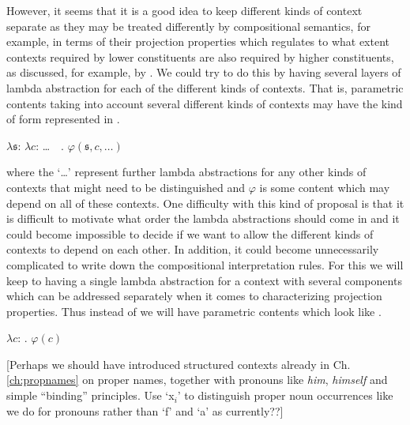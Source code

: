 However, it seems that it is a good idea to keep different kinds of
context separate as they may be treated differently by compositional
semantics, for example, in terms of their projection properties which
regulates to what extent contexts required by lower constituents are
also required by higher constituents, as discussed, for example, by
\cite{Potts2005}.  We could try to do this by having several layers of
lambda abstraction for each of the different kinds of contexts.  That
is, parametric contents taking into account several different kinds of
contexts may have the kind of form represented in \nexteg{}.
\begin{ex} 
$\lambda\mathfrak{s}$: $\lambda c$: \ldots\ \  . $\varphi(\mathfrak{s},c,\ldots)$
\end{ex} 
where the `\ldots' represent further lambda abstractions for any other
kinds of contexts that might need to be distinguished and $\varphi$ is
some content which may depend on all of these contexts.  One
difficulty with this kind of proposal is that it is difficult to
motivate what order the lambda abstractions should come in and it
could become impossible to decide if we want to allow the different
kinds of contexts to depend on each other.  In addition, it could
become unnecessarily complicated to write down the compositional
interpretation rules.  For this we will keep to having a single lambda
abstraction for a context with several components which can be
addressed separately when it comes to characterizing projection
properties.  Thus instead of \preveg{} we will have parametric
contents which look like \nexteg{}.
\begin{ex} 
$\lambda c$: . $\varphi(c)$ 
\end{ex} 

[Perhaps we should have introduced structured contexts already in
Ch. \ref{ch:propnames} on proper names, together with pronouns like
\textit{him}, \textit{himself} and simple ``binding'' principles.  Use
`x$_i$' to distinguish proper noun occurrences like we do for pronouns rather
than `f' and `a' as currently??]

